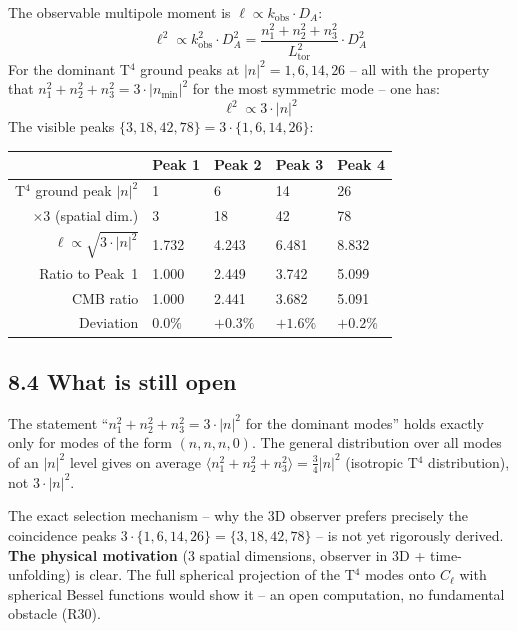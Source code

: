 The observable multipole moment is
$\ell \propto k_\mathrm{obs} \cdot D_A$:
\[
  \ell^2 \propto k_\mathrm{obs}^2 \cdot D_A^2
  = \frac{n_1^2+n_2^2+n_3^2}{L_\mathrm{tor}^2} \cdot D_A^2
\]
For the dominant T$^4$ ground peaks at $|n|^2 = 1, 6, 14, 26$
-- all with the property that $n_1^2+n_2^2+n_3^2 = 3\cdot|n_\mathrm{min}|^2$
for the most symmetric mode -- one has:
\[
  \ell^2 \propto 3 \cdot |n|^2
\]
The visible peaks $\{3, 18, 42, 78\} = 3\cdot\{1, 6, 14, 26\}$:

\begin{center}
\begin{tabular}{rllll}
\toprule
 & Peak 1 & Peak 2 & Peak 3 & Peak 4 \\
\midrule
T$^4$ ground peak $|n|^2$ & 1 & 6 & 14 & 26 \\
$\times 3$ (spatial dim.) & 3 & 18 & 42 & 78 \\
$\ell \propto \sqrt{3\cdot|n|^2}$ & 1{.}732 & 4{.}243 & 6{.}481 & 8{.}832 \\
Ratio to Peak~1 & 1{.}000 & 2{.}449 & 3{.}742 & 5{.}099 \\
CMB ratio & 1{.}000 & 2{.}441 & 3{.}682 & 5{.}091 \\
Deviation & $0{.}0\%$ & $+0{.}3\%$ & $+1{.}6\%$ & $+0{.}2\%$ \\
\bottomrule
\end{tabular}
\end{center}

\subsection*{8.4 What is still open}

The statement ``$n_1^2+n_2^2+n_3^2 = 3\cdot|n|^2$ for the dominant
modes'' holds exactly only for modes of the form $(n,n,n,0)$.
The general distribution over all modes of an $|n|^2$ level
gives on average $\langle n_1^2+n_2^2+n_3^2\rangle = \tfrac{3}{4}|n|^2$
(isotropic T$^4$ distribution), not $3\cdot|n|^2$.

The exact selection mechanism -- why the 3D observer prefers
precisely the coincidence peaks
$3\cdot\{1,6,14,26\}=\{3,18,42,78\}$ -- is not yet rigorously derived.
\textbf{The physical motivation} (3 spatial dimensions,
observer in 3D + time-unfolding) is clear.
The full spherical projection of the T$^4$ modes onto $C_\ell$
with spherical Bessel functions would show it --
an open computation, no fundamental obstacle (R30).

